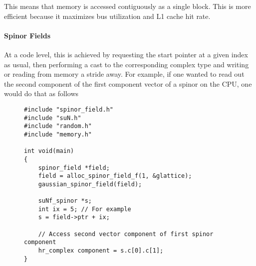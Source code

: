 \documentclass[12pt]{article}
\begin{document}
This means that memory is accessed contiguously as a single block. This is more efficient because it maximizes bus utilization and L1 cache hit rate. 

\paragraph{Spinor Fields}
At a code level, this is achieved by requesting the start pointer at a given index as usual, then performing a cast to the corresponding complex type and writing or reading from memory a stride away. For example, if one wanted to read out the second component of the first component vector of a spinor on the CPU, one would do that as follows

\begin{figure}[H]
\begin{lstlisting}[caption=Low level access of single components on CPU]
#include "spinor_field.h"
#include "suN.h"
#include "random.h"
#include "memory.h"

int void(main) 
{
    spinor_field *field;
    field = alloc_spinor_field_f(1, &glattice);
    gaussian_spinor_field(field);
    
    suNf_spinor *s;
    int ix = 5; // For example
    s = field->ptr + ix;
    
    // Access second vector component of first spinor component
    hr_complex component = s.c[0].c[1];
}
\end{lstlisting}
\end{figure}
\end{document}
